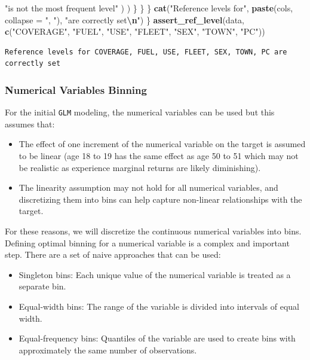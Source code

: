 \documentclass[
  english,
  11pt,
]{article}
\newenvironment{Shaded}{\begin{snugshade}}{\end{snugshade}}
\newcommand{\AttributeTok}[1]{\textcolor[rgb]{0.13,0.29,0.53}{#1}}
\newcommand{\FunctionTok}[1]{\textcolor[rgb]{0.13,0.29,0.53}{\textbf{#1}}}
\newcommand{\NormalTok}[1]{#1}
\newcommand{\SpecialCharTok}[1]{\textcolor[rgb]{0.81,0.36,0.00}{\textbf{#1}}}
\newcommand{\StringTok}[1]{\textcolor[rgb]{0.31,0.60,0.02}{#1}}
\providecommand{\tightlist}{%
  \setlength{\itemsep}{0pt}\setlength{\parskip}{0pt}}
\begin{document}
\begin{Shaded}
\begin{Highlighting}[]
                        \StringTok{"is not the most frequent level"}
\NormalTok{                    )}
\NormalTok{                )}
\NormalTok{            \}}
\NormalTok{    \}}
\NormalTok{    \}}
    \FunctionTok{cat}\NormalTok{(}\StringTok{"Reference levels for"}\NormalTok{, }\FunctionTok{paste}\NormalTok{(cols, }\AttributeTok{collapse =} \StringTok{", "}\NormalTok{), }\StringTok{"are correctly set}\SpecialCharTok{\textbackslash{}n}\StringTok{"}\NormalTok{)}
\NormalTok{\}       }
\FunctionTok{assert\_ref\_level}\NormalTok{(data,  }\FunctionTok{c}\NormalTok{(}\StringTok{"COVERAGE"}\NormalTok{, }\StringTok{"FUEL"}\NormalTok{, }\StringTok{"USE"}\NormalTok{, }\StringTok{"FLEET"}\NormalTok{, }\StringTok{"SEX"}\NormalTok{, }\StringTok{"TOWN"}\NormalTok{, }\StringTok{"PC"}\NormalTok{))}
\end{Highlighting}
\end{Shaded}

\begin{verbatim}
Reference levels for COVERAGE, FUEL, USE, FLEET, SEX, TOWN, PC are correctly set
\end{verbatim}

\subsubsection{Numerical Variables
Binning}\label{numerical-variables-binning}

For the initial \texttt{GLM} modeling, the numerical variables can be
used but this assumes that:

\begin{itemize}
\tightlist
\item
  The effect of one increment of the numerical variable on the target is
  assumed to be linear (age 18 to 19 has the same effect as age 50 to 51
  which may not be realistic as experience marginal returns are likely
  diminishing).
\item
  The linearity assumption may not hold for all numerical variables, and
  discretizing them into bins can help capture non-linear relationships
  with the target.
\end{itemize}

For these reasons, we will discretize the continuous numerical variables
into bins. Defining optimal binning for a numerical variable is a
complex and important step. There are a set of naive approaches that can
be used:

\begin{itemize}
\tightlist
\item
  Singleton bins: Each unique value of the numerical variable is treated
  as a separate bin.
\item
  Equal-width bins: The range of the variable is divided into intervals
  of equal width.
\item
  Equal-frequency bins: Quantiles of the variable are used to create
  bins with approximately the same number of observations.
\end{itemize}
\end{document}
